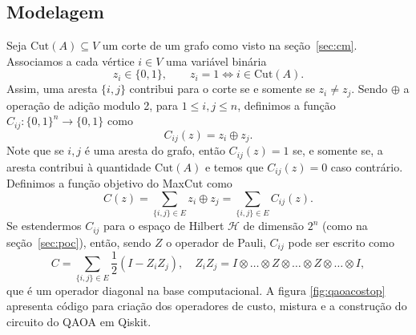 \subsection{Modelagem}


Seja $\text{Cut}(A) \subseteq V$ um corte de um grafo como visto na seção~\ref{sec:cm}. Associamos a cada vértice $i\in V$ uma variável binária
\begin{equation}
    z_i\in \{0, 1\}, \qquad z_i = 1 \iff i \in \text{Cut}(A).
\end{equation}
Assim, uma aresta $\{i,j\}$ contribui para o corte se e somente se $z_i\neq z_j$. Sendo $\oplus$ a operação de adição modulo 2, para $1\leq i,j \leq n$, definimos a função $C_{ij}: \{0,1\}^n\to \{0,1\}$ como
\begin{equation}
    C_{ij}(z) = z_i\oplus z_j.
\end{equation}
Note que se ${i,j}$ é uma aresta do grafo, então $C_{ij}(z)=1$ se, e somente se, a aresta contribui à quantidade $\text{Cut}(A)$ e temos que $C_{ij}(z)=0$ caso contrário. Definimos a função objetivo do MaxCut como
\begin{equation}
    C(z) = \sum_{\{i,j\}\in E} z_i \oplus z_j = \sum_{\{i,j\} \in E} C_{ij}(z).
\end{equation}
Se estendermos $C_{ij}$ para o espaço de Hilbert $\mathcal{H}$ de dimensão $2^n$ (como na seção~\ref{sec:poc}), então, sendo $Z$ o operador de Pauli, $C_{ij}$ pode ser escrito como
\begin{equation}
    C = \sum_{\{i,j\}\in E} \frac{1}{2}(I-Z_iZ_j), \quad Z_iZ_j = I\otimes\dotso\otimes Z\otimes\dotso\otimes Z\otimes\dotso\otimes I,
\end{equation}
que é um operador diagonal na base computacional. A figura \ref{fig:qaoacostop} apresenta código para criação dos operadores de custo, mistura e a construção do circuito do QAOA em Qiskit.

